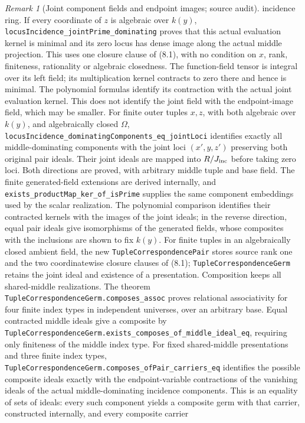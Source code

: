 \documentclass[11pt,oneside]{article}
\theoremstyle{definition}
\theoremstyle{remark}
\newtheorem{remark}[theorem]{Remark}
\newcommand{\lean}[1]{\nolinkurl{#1}}
\begin{document}
\begin{remark}[Joint component fields and endpoint images; source audit]
incidence ring. If every coordinate of $z$ is algebraic over $k(y)$,
\lean{locusIncidence_jointPrime_dominating} proves that this actual
evaluation kernel is minimal and its zero locus has dense image along the
actual middle projection. This uses one closure clause of (8.1), with no
condition on $x$, rank, finiteness, rationality or algebraic closedness.
The function-field tensor is integral over its left field; its multiplication
kernel contracts to zero there and hence is minimal. The polynomial formulas
identify its contraction with the actual joint evaluation kernel. This does
not identify the joint field with the endpoint-image field, which may be
smaller. For finite outer tuples $x,z$, with both algebraic over $k(y)$,
and algebraically closed $\Omega$,
\lean{locusIncidence_dominatingComponents_eq_jointLoci} identifies exactly
all middle-dominating components with the joint loci $(x',y,z')$ preserving
both original pair ideals. Their joint ideals are mapped into $R/J_{\rm inc}$
before taking zero loci. Both directions are proved, with arbitrary middle
tuple and base field. The finite generated-field extensions are derived
internally, and \lean{exists_productMap_ker_of_isPrime} supplies the same
component embeddings used by the scalar realization. The polynomial
comparison identifies their contracted kernels with the images of the joint
ideals; in the reverse direction, equal pair ideals give isomorphisms of the
generated fields, whose composites with the inclusions are shown to fix $k(y)$.
For finite tuples in an algebraically closed ambient field, the new
\lean{TupleCorrespondencePair} stores source rank one and the two coordinatewise
closure clauses of (8.1); \lean{TupleCorrespondenceGerm} retains the joint ideal
and existence of a presentation. Composition keeps all shared-middle realizations.
The theorem \lean{TupleCorrespondenceGerm.composes_assoc} proves relational
associativity for four finite index types in independent universes, over an
arbitrary base. Equal contracted middle ideals give a composite by
\lean{TupleCorrespondenceGerm.exists_composes_of_middle_ideal_eq}, requiring
only finiteness of the middle index type. For fixed shared-middle presentations
and three finite index types,
\lean{TupleCorrespondenceGerm.composes_ofPair_carriers_eq} identifies the possible
composite ideals exactly with the endpoint-variable contractions of the
vanishing ideals of the actual middle-dominating incidence components.
This is an equality of sets of ideals: every such component yields a composite
germ with that carrier, constructed internally, and every composite carrier

\end{remark}
\end{document}
